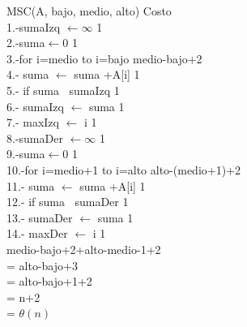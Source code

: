 \documentclass[spanish]{article}
\begin{document}
	MSC(A, bajo, medio, alto)  \hspace{4cm} Costo\\
    	1.-sumaIzq $ \leftarrow \infty $ \hspace{6cm} 1\\
    	2.-suma$ \leftarrow 0 $ \hspace{7cm} 1\\
    	3.-for i=medio to i=bajo \hspace{4cm} medio-bajo+2\\
    	4.-\hspace{0.5 cm} suma $ \leftarrow $ suma +A[i] \hspace{4.5cm} 1\\
    	5.-\hspace{0.5cm} if suma $ \> $ sumaIzq \hspace{5cm} 1 \\
    	6.-\hspace{1cm} sumaIzq $ \leftarrow $ suma \hspace{4.5cm} 1 \\
    	7.-\hspace{1cm} maxIzq $ \leftarrow $ i \hspace{5.5cm} 1 \\
        8.-sumaDer $ \leftarrow \infty $ \hspace{6cm} 1\\
    	9.-suma$ \leftarrow 0 $ \hspace{7cm} 1\\
        10.-for i=medio+1 to i=alto \hspace{4cm} alto-(medio+1)+2\\
    	11.-\hspace{0.5 cm} suma $ \leftarrow $ suma +A[i] \hspace{4.2cm} 1\\
    	12.-\hspace{0.5cm} if suma $ \> $ sumaDer \hspace{4.5cm} 1 \\
    	13.-\hspace{1cm} sumaDer $ \leftarrow $ suma \hspace{4cm} 1 \\
    	14.-\hspace{1cm} maxDer $ \leftarrow $ i \hspace{5cm} 1 \\
    	
    	\noindent medio-bajo+2+alto-medio-1+2 \\
    	= alto-bajo+3 \\
    	= alto-bajo+1+2 \\
    	= n+2 \\
    	= $ \theta (n) $
\end{document}
